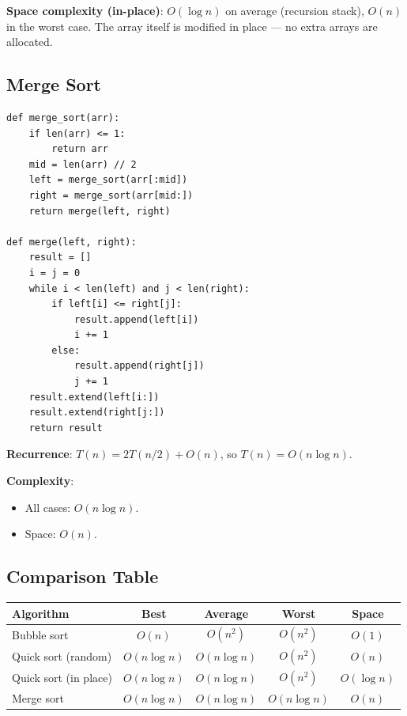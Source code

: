 \documentclass[11pt,a4paper]{article}
\begin{document}
\textbf{Space complexity (in-place)}: $O(\log n)$ on average (recursion stack), $O(n)$ in the worst case. The array itself is modified in place --- no extra arrays are allocated.

\subsection{Merge Sort}

\begin{lstlisting}
def merge_sort(arr):
    if len(arr) <= 1:
        return arr
    mid = len(arr) // 2
    left = merge_sort(arr[:mid])
    right = merge_sort(arr[mid:])
    return merge(left, right)

def merge(left, right):
    result = []
    i = j = 0
    while i < len(left) and j < len(right):
        if left[i] <= right[j]:
            result.append(left[i])
            i += 1
        else:
            result.append(right[j])
            j += 1
    result.extend(left[i:])
    result.extend(right[j:])
    return result
\end{lstlisting}

\textbf{Recurrence}: $T(n) = 2T(n/2) + O(n)$, so $T(n) = O(n \log n)$.

\textbf{Complexity}:
\begin{itemize}
    \item All cases: $O(n \log n)$.
    \item Space: $O(n)$.
\end{itemize}

\subsection{Comparison Table}

\begin{center}
\begin{tabular}{lcccc}
\toprule
Algorithm & Best & Average & Worst & Space \\
\midrule
Bubble sort & $O(n)$ & $O(n^2)$ & $O(n^2)$ & $O(1)$ \\
Quick sort (random) & $O(n \log n)$ & $O(n \log n)$ & $O(n^2)$ & $O(n)$ \\
Quick sort (in place) & $O(n \log n)$ & $O(n \log n)$ & $O(n^2)$ & $O(\log n)$ \\
Merge sort & $O(n \log n)$ & $O(n \log n)$ & $O(n \log n)$ & $O(n)$ \\
\bottomrule
\end{tabular}
\end{center}
\end{document}
